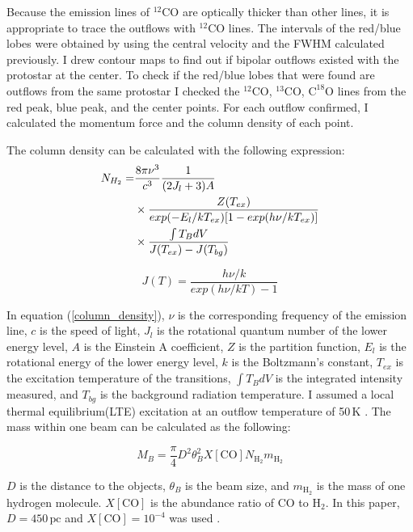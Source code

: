Because the emission lines of $^{12}$CO are optically thicker than other lines, it is appropriate to trace the outflows with $^{12}$CO lines. The intervals of the red/blue lobes were obtained by using the central velocity and the FWHM calculated previously. I drew contour maps to find out if bipolar outflows existed with the protostar at the center. To check if the red/blue lobes that were found are outflows from the same protostar I checked the $^{12}$CO, $^{13}$CO, $\textrm{C}^{18}\textrm{O}$ lines from the red peak, blue peak, and the center points. For each outflow confirmed, I calculated the momentum force and the column density of each point.

The column density can be calculated with the following expression:
\begin{align}
	N_{H_2} =& \frac{8\pi \nu^3}{c^3} \frac{1}{(2J_l +3)A}  \notag \\
	& \times \frac{Z(T_{ex})}{exp(-E_l / kT_{ex})[1-exp(h\nu / kT_{ex})]} \notag \\
	& \times \frac{\int T_B dV}{J(T_{ex})-J(T_{bg})} \label{column_density}
\end{align}

\begin{equation}
J(T) = \frac{h \nu / k}{exp(h\nu / kT)-1}
\end{equation}

In equation (\ref{column_density}), $\nu$ is the corresponding frequency of the emission line, $c$ is the speed of light, $J_l$ is the rotational quantum number of the lower energy level, $A$ is the Einstein A coefficient, $Z$ is the partition function, $E_l$ is the rotational energy of the lower energy level, $k$ is the Boltzmann's constant, $T_{ex}$ is the excitation temperature of the transitions, $\int T_B dV$ is the integrated intensity measured, and $T_{bg}$ is the background radiation temperature. I assumed a local thermal equilibrium(LTE) excitation at an outflow temperature of 50$\,$K \cite{takahashi2008millimeter}.
The mass within one beam can be calculated as the following:

\begin{equation}
M_B =  \frac{\pi}{4} D^2 \theta_B ^2 X[\textrm{CO}] N_{\textrm{H}_2} m_{\textrm{H}_2} \label{beam_mass}
\end{equation}

$D$ is the distance to the objects, $\theta_B$ is the beam size, and $m_{\textrm{H}_2}$ is the mass of one hydrogen molecule. $X[\textrm{CO}]$ is the abundance ratio of CO to $\textrm{H}_2$. In this paper, $D = 450\,\textrm{pc}$ and $X[\textrm{CO}] = 10^{-4}$ was used \cite{hatchell2007star}.\\

